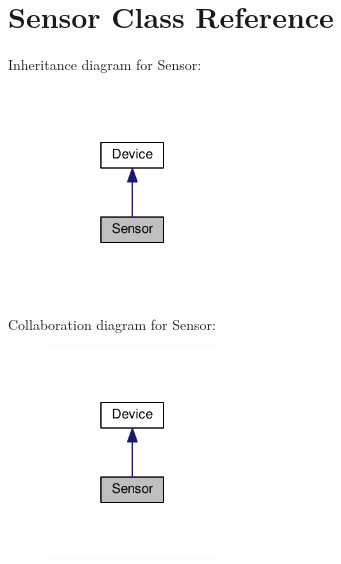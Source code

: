 \hypertarget{class_sensor}{}\section{Sensor Class Reference}
\label{class_sensor}


Inheritance diagram for Sensor\+:
\nopagebreak
\begin{figure}[H]
\begin{center}
\leavevmode
\includegraphics[width=127pt]{class_sensor__inherit__graph}
\end{center}
\end{figure}


Collaboration diagram for Sensor\+:
\nopagebreak
\begin{figure}[H]
\begin{center}
\leavevmode
\includegraphics[width=127pt]{class_sensor__coll__graph}
\end{center}
\end{figure}
